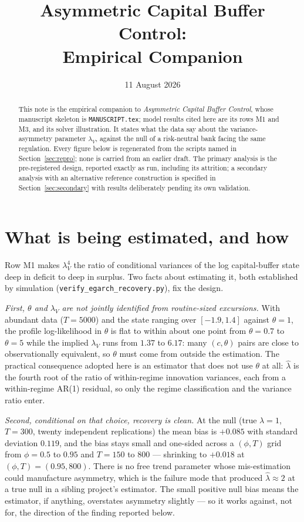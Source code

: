 \documentclass[11pt]{article}
\title{Asymmetric Capital Buffer Control:\\ Empirical Companion}
\author{}
\date{11 August 2026}
\newcommand{\lamV}{\lambda_V}
\newcommand{\lamhat}{\hat\lambda}
\begin{document}
\maketitle

\begin{abstract}
\noindent
This note is the empirical companion to \emph{Asymmetric Capital Buffer
Control}, whose manuscript skeleton is \texttt{MANUSCRIPT.tex}; model
results cited here are its rows M1 and M3, and its solver illustration. It
states what the data say about the variance-asymmetry parameter $\lamV$,
against the null of a risk-neutral bank facing the same regulation. Every
figure below is regenerated from the scripts named in
Section~\ref{sec:repro}; none is carried from an earlier draft. The
primary analysis is the pre-registered design, reported exactly as run,
including its attrition; a secondary analysis with an alternative
reference construction is specified in Section~\ref{sec:secondary} with
results deliberately pending its own validation.
\end{abstract}

\section{What is being estimated, and how}
\label{sec:estimand}

Row M1 makes $\lamV^4$ the ratio of conditional variances of the log
capital-buffer state deep in deficit to deep in surplus. Two facts about
estimating it, both established by simulation
(\texttt{verify\_egarch\_recovery.py}), fix the design.

\emph{First, $\theta$ and $\lamV$ are not jointly identified from
routine-sized excursions.} With abundant data ($T=5000$) and the state
ranging over $[-1.9, 1.4]$ against $\theta=1$, the profile log-likelihood
in $\theta$ is flat to within about one point from $\theta=0.7$ to
$\theta=5$ while the implied $\lamV$ runs from $1.37$ to $6.17$: many
$(c,\theta)$ pairs are close to observationally equivalent, so $\theta$
must come from outside the estimation. The practical consequence adopted
here is an estimator that does not use $\theta$ at all: $\lamhat$ is the
fourth root of the ratio of within-regime innovation variances, each from
a within-regime AR(1) residual, so only the regime classification and the
variance ratio enter.

\emph{Second, conditional on that choice, recovery is clean.} At the null
(true $\lambda=1$, $T=300$, twenty independent replications) the mean
bias is $+0.085$ with standard deviation $0.119$, and the bias stays
small and one-sided across a $(\phi,T)$ grid from $\phi=0.5$ to $0.95$
and $T=150$ to $800$ --- shrinking to $+0.018$ at $(\phi,T)=(0.95,800)$.
There is no free trend parameter whose mis-estimation could manufacture
asymmetry, which is the failure mode that produced $\lamhat\approx 2$ at
a true null in a sibling project's estimator. The small positive null
bias means the estimator, if anything, overstates asymmetry slightly ---
so it works against, not for, the direction of the finding reported
below.
\end{document}
